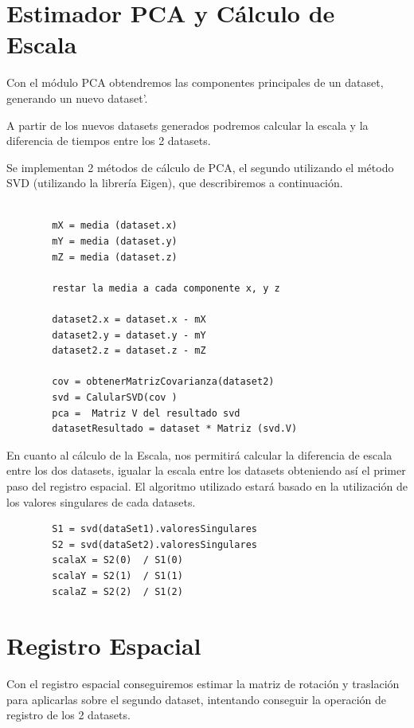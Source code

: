 \section{Estimador PCA y Cálculo de Escala}

	Con el módulo PCA obtendremos las componentes principales de un dataset, generando un nuevo dataset'.

	A partir de los nuevos datasets generados podremos calcular la escala y la diferencia de tiempos entre los 2 datasets.

	Se implementan 2 métodos de cálculo de PCA, el segundo utilizando el método SVD (utilizando la librería Eigen), que describiremos a continuación.

	\begin{lstlisting}
		
		mX = media (dataset.x)
		mY = media (dataset.y)
		mZ = media (dataset.z)

		restar la media a cada componente x, y z

		dataset2.x = dataset.x - mX
		dataset2.y = dataset.y - mY
		dataset2.z = dataset.z - mZ

		cov = obtenerMatrizCovarianza(dataset2)
		svd = CalularSVD(cov )
		pca =  Matriz V del resultado svd
		datasetResultado = dataset * Matriz (svd.V)

	\end{lstlisting}

    En cuanto al cálculo de la Escala, nos permitirá calcular la diferencia de escala entre los dos datasets, igualar la escala entre los datasets obteniendo así el primer paso del registro espacial. El algoritmo utilizado estará basado en la utilización de los valores singulares de cada datasets.
        
	\begin{lstlisting}
		S1 = svd(dataSet1).valoresSingulares
		S2 = svd(dataSet2).valoresSingulares
		scalaX = S2(0)  / S1(0)
		scalaY = S2(1)  / S1(1)
		scalaZ = S2(2)  / S1(2)
	\end{lstlisting}

\section{Registro Espacial}

Con el registro espacial conseguiremos estimar la matriz de rotación y traslación para aplicarlas sobre el segundo dataset, intentando conseguir la operación de registro de los 2 datasets.

